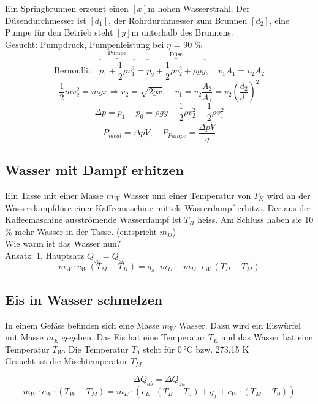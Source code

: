 Ein Springbrunnen erzeugt einen $[x]$m hohen Wasserstrahl. Der Düsendurchmesser ist $[d_1]$, der Rohrdurchmesser zum Brunnen $[d_2]$, eine Pumpe für den Betrieb steht $[y]$m unterhalb des Brunnens. \\
Gesucht: Pumpdruck, Pumpenleistung bei $\eta$ = 90 $\%$\\

$$\text{Bernoulli:} \quad  \overbrace{ p_1 + \frac{1}{2}\rho v_1^2}^{\text{Pumpe}} = \overbrace{p_2 + \frac{1}{2}\rho v_2^2 + \rho g y}^{\text{Düse}}, \quad v_1A_1 = v_2A_2 $$
$$ \frac{1}{2}mv^2_2 = mgx \Rightarrow v_2 = \sqrt{2gx}, \quad v_1 = v_2\frac{A_2}{A_1} = v_2\left(\frac{d_2}{d_1}\right)^2 $$
$$ \Delta p = p_1 - p_0 = \rho g y + \frac{1}{2}\rho v_2^2 - \frac{1}{2}\rho v_1^2 $$
$$ P_{ideal} = \Delta p \dot{V}, \quad P_{Pumpe} = \frac{\Delta p \dot{V}}{\eta} $$


\subsection{Wasser mit Dampf erhitzen}

Ein Tasse mit einer Masse $m_W$ Wasser und einer Temperatur von $T_K$ wird an
der Wasserdampfdüse einer Kaffeemaschine mittels Wasserdampf erhitzt. Der aus der
Kaffeemaschine ausströmende Wasserdampf ist $T_H$ heiss. Am Schluss haben sie 10 \%
mehr Wasser in der Tasse. (entspricht $m_D$)\\
Wie warm ist das Wasser nun? \\

Ansatz: 1. Hauptsatz \quad $Q_{zu} = Q_{ab}$ \\

$$ m_W \cdot c_W \, (T_M - T_K) = q_s \cdot m_D + m_D \cdot c_W \, (T_H - T_M) $$



\subsection{Eis in Wasser schmelzen}

In einem Gefäss befinden sich eine Masse $m_W$ Wasser. Dazu wird ein Eiswürfel mit Masse $m_E$ gegeben. Das Eis hat eine Temperatur $T_E$ und das Wasser hat eine Temperatur $T_W$. Die Temperatur $T_0$ steht für $0 \, \text{°C}$ bzw. 273.15 K \\
Gesucht ist die Mischtemperatur $T_M$ 

$$ \Delta Q_{ab} = \Delta Q_{zu}$$
$$ m_W \cdot c_W \cdot (T_W - T_M) = m_E \cdot \left( c_E \cdot (T_E - T_0) + q_f  +  c_W \cdot (T_M - T_0) \right) $$

